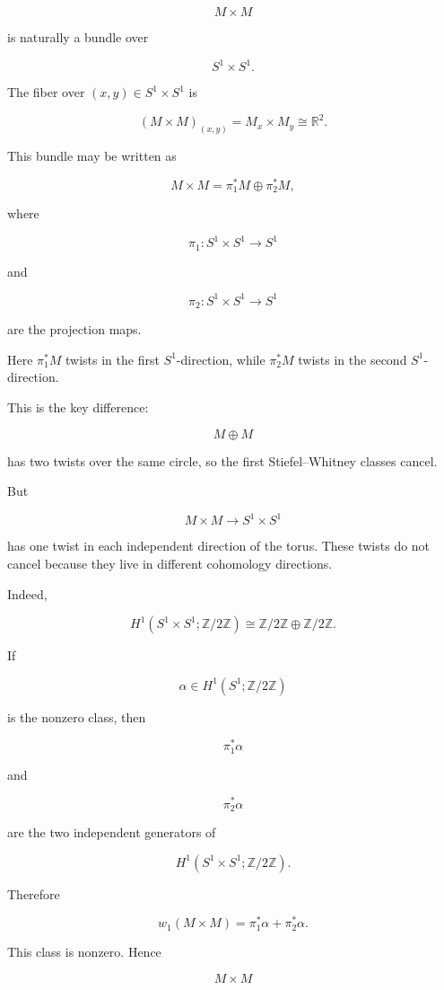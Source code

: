 \documentclass[12pt,a4paper]{article}
\newcommand{\R}{\mathbb{R}}
\newcommand{\Ztwo}{\mathbb{Z}/2\mathbb{Z}}
\theoremstyle{notespace}
\begin{document}
	\[
	M\times M
	\]
	
	is naturally a bundle over
	
	\[
	S^{1}\times S^{1}.
	\]
	
	The fiber over \((x,y)\in S^{1}\times S^{1}\) is
	
	\[
	(M\times M)_{(x,y)}=M_x\times M_y\cong \R^{2}.
	\]
	
	This bundle may be written as
	
	\[
	M\times M
	=
	\pi_1^{*}M\oplus \pi_2^{*}M,
	\]
	
	where
	
	\[
	\pi_1:S^{1}\times S^{1}\to S^{1}
	\]
	
	and
	
	\[
	\pi_2:S^{1}\times S^{1}\to S^{1}
	\]
	
	are the projection maps.
	
	Here \(\pi_1^{*}M\) twists in the first \(S^{1}\)-direction, while \(\pi_2^{*}M\) twists in the second \(S^{1}\)-direction.
	
	This is the key difference:
	
	\[
	M\oplus M
	\]
	
	has two twists over the same circle, so the first Stiefel--Whitney classes cancel.
	
	But
	
	\[
	M\times M\to S^{1}\times S^{1}
	\]
	
	has one twist in each independent direction of the torus. These twists do not cancel because they live in different cohomology directions.
	
	Indeed,
	
	\[
	H^{1}(S^{1}\times S^{1};\Ztwo)
	\cong
	\Ztwo\oplus \Ztwo.
	\]
	
	If
	
	\[
	\alpha\in H^{1}(S^{1};\Ztwo)
	\]
	
	is the nonzero class, then
	
	\[
	\pi_1^{*}\alpha
	\]
	
	and
	
	\[
	\pi_2^{*}\alpha
	\]
	
	are the two independent generators of
	
	\[
	H^{1}(S^{1}\times S^{1};\Ztwo).
	\]
	
	Therefore
	
	\[
	w_1(M\times M)
	=
	\pi_1^{*}\alpha+\pi_2^{*}\alpha.
	\]
	
	This class is nonzero. Hence
	
	\[
	M\times M
	\]
	
\end{document}
